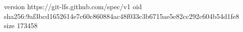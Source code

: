 version https://git-lfs.github.com/spec/v1
oid sha256:9af3bcd1652614e7c60c860884ac48f033c3b6715ae5e82cc292c604b54d1fe8
size 173458
